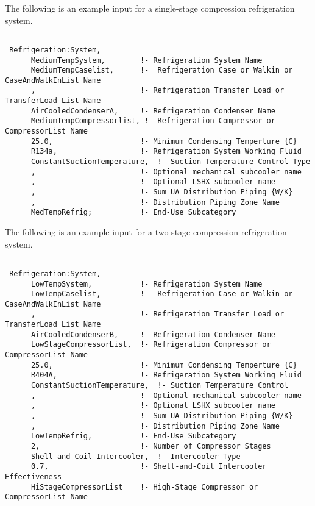 The following is an example input for a single-stage compression refrigeration system.

\begin{lstlisting}

 Refrigeration:System,
      MediumTempSystem,        !- Refrigeration System Name
      MediumTempCaselist,      !-  Refrigeration Case or Walkin or CaseAndWalkInList Name
      ,                        !- Refrigeration Transfer Load or TransferLoad List Name
      AirCooledCondenserA,     !- Refrigeration Condenser Name
      MediumTempCompressorlist, !- Refrigeration Compressor or CompressorList Name
      25.0,                    !- Minimum Condensing Temperture {C}
      R134a,                   !- Refrigeration System Working Fluid
      ConstantSuctionTemperature,  !- Suction Temperature Control Type
      ,                        !- Optional mechanical subcooler name
      ,                        !- Optional LSHX subcooler name
      ,                        !- Sum UA Distribution Piping {W/K}
      ,                        !- Distribution Piping Zone Name
      MedTempRefrig;           !- End-Use Subcategory
\end{lstlisting}

The following is an example input for a two-stage compression refrigeration system.

\begin{lstlisting}

 Refrigeration:System,
      LowTempSystem,           !- Refrigeration System Name
      LowTempCaselist,         !-  Refrigeration Case or Walkin or CaseAndWalkInList Name
      ,                        !- Refrigeration Transfer Load or TransferLoad List Name
      AirCooledCondenserB,     !- Refrigeration Condenser Name
      LowStageCompressorList,  !- Refrigeration Compressor or CompressorList Name
      25.0,                    !- Minimum Condensing Temperture {C}
      R404A,                   !- Refrigeration System Working Fluid
      ConstantSuctionTemperature,  !- Suction Temperature Control
      ,                        !- Optional mechanical subcooler name
      ,                        !- Optional LSHX subcooler name
      ,                        !- Sum UA Distribution Piping {W/K}
      ,                        !- Distribution Piping Zone Name
      LowTempRefrig,           !- End-Use Subcategory
      2,                       !- Number of Compressor Stages
      Shell-and-Coil Intercooler,  !- Intercooler Type
      0.7,                     !- Shell-and-Coil Intercooler Effectiveness
      HiStageCompressorList    !- High-Stage Compressor or CompressorList Name
\end{lstlisting}

